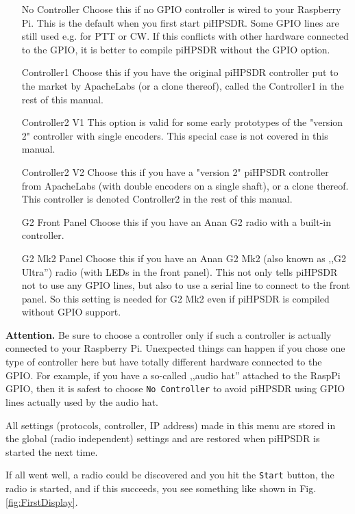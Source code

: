 \documentclass[12pt]{book}
\def\rett#1{\texttt{\color{red}#1}}
\def\pH{pi\-HPSDR\xspace}
\begin{document}
\begin{itemize}[font=\texttt, left=80pt]
\item[No Controller]{Choose this if no GPIO controller is wired to your Raspberry Pi. This is the default
when you first start \pH. Some GPIO lines are still used e.g. for PTT or CW. If this conflicts with other
hardware connected to the GPIO, it is better to compile \pH without the GPIO option.}
\item[Controller1]{Choose this if you have the original \pH controller put to the market by ApacheLabs
(or a clone thereof), called the Controller1 in the rest
of this manual.}
\item[Controller2 V1]{This option is valid for some early prototypes of the "version 2" controller with
single encoders. This special case is not covered in this manual.}
\item[Controller2 V2]{Choose this if you have a "version 2" \pH controller from ApacheLabs (with double encoders
on a single shaft), or a clone thereof.
This controller is denoted Controller2 in the rest of this manual.}
\item[G2 Front Panel]{Choose this if you have an Anan G2 radio with a built-in controller.}
\item[G2 Mk2 Panel]{Choose this if you have an Anan G2 Mk2 (also known as ,,G2 Ultra'')
radio (with LEDs in the front panel).
This not only tells \pH not to use any GPIO lines, but also to use a serial line to connect to the front panel.
So this setting is needed for G2 Mk2 even if \pH is compiled without GPIO support.}
\end{itemize}

\textbf{Attention.} Be sure to choose a controller only if such a controller is actually connected to your
Raspberry Pi. Unexpected things can happen if you chose one type of controller here but have totally different
hardware connected to the GPIO. For example, if you have a so-called ,,audio hat'' attached to the RaspPi
GPIO, then it is safest to choose \texttt{No Controller} to avoid \pH using GPIO lines actually used
by the audio hat.

All settings (protocols, controller, IP address) made in this menu are stored in the global (radio
independent) settings
and are restored when \pH is started the next time.

If all went well, a radio could be discovered and you hit the \rett{Start} button, the radio is started, and
if this succeeds, you see something like shown in Fig. \ref{fig:FirstDisplay}.
\end{document}

